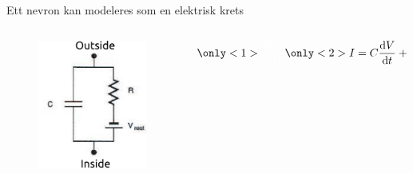 \documentclass[presentation]{beamer}
\begin{document}
\begin{frame}{Ett nevron kan modeleres som en elektrisk krets}
    \begin{columns}
    \begin{column}{0.5\textwidth}
        \begin{center}
        \begin{figure}
            {\includegraphics[width=1\textwidth]{circuit2.png}}
     \end{figure}
    \end{center}
    \end{column}
    \begin{column}{0.5\textwidth}  %
        \begin{center}
            \begin{equation*}
                   \only<1>{ \color{white}\frac{{\mathrm d} V_m}{{\mathrm d} }}
                   \only<2>{ I = C\frac{{\mathrm d} V}{{\mathrm d} t}  + I_{\text{kanaler}}}
            \end{equation*}
         \end{center}
    \end{column}
    \end{columns}
\end{frame}
\end{document}
